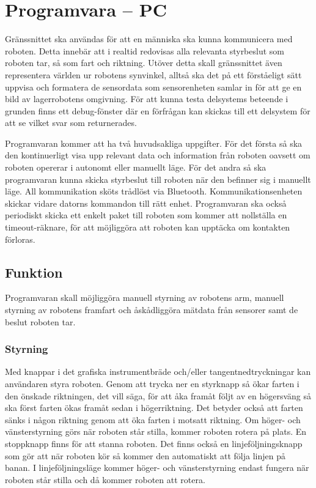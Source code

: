 

\section{Programvara – PC}

Gränssnittet ska användas för att en människa ska kunna kommunicera med roboten. Detta innebär att i realtid redovisas alla relevanta styrbeslut som roboten tar, så som fart och riktning. Utöver detta skall gränssnittet även representera världen ur robotens synvinkel, alltså ska det på ett förståeligt sätt uppvisa och formatera de sensordata som sensorenheten samlar in för att ge en bild av lagerrobotens omgivning. För att kunna testa delsystems beteende i grunden finns ett debug-fönster där en förfrågan kan skickas till ett delsystem för att se vilket svar som returnerades.




Programvaran kommer att ha två huvudsakliga uppgifter. För det första så ska den kontinuerligt visa upp relevant data och information från roboten oavsett om roboten opererar i autonomt eller manuellt läge. För det andra så ska programvaran kunna skicka styrbeslut till roboten när den befinner sig i manuellt läge. All kommunikation sköts trådlöst via Bluetooth. Kommunikationsenheten skickar vidare datorns kommandon till rätt enhet. Programvaran ska också periodiskt skicka ett enkelt paket till roboten som kommer att nollställa en timeout-räknare, för att möjliggöra att roboten kan upptäcka om kontakten förloras.

\subsection{Funktion}
Programvaran skall möjliggöra manuell styrning av robotens arm, manuell styrning av robotens framfart och åskådliggöra mätdata från sensorer samt de beslut roboten tar.

\subsubsection{Styrning}
Med knappar i det grafiska instrumentbräde och/eller tangentnedtryckningar kan användaren styra roboten. Genom att trycka ner en styrknapp så ökar farten i den önskade riktningen, det vill säga, för att åka framåt följt av en högersväng så ska först farten ökas framåt sedan i högerriktning. Det betyder också att farten sänks i någon riktning genom att öka farten i motsatt riktning. Om höger- och vänsterstyrning görs när roboten står stilla, kommer roboten rotera på plats. En stoppknapp finns för att stanna roboten. Det finns också en linjeföljningsknapp som gör att när roboten kör så kommer den automatiskt att följa linjen på banan. I linjeföljningsläge kommer höger- och vänsterstyrning endast fungera när roboten står stilla och då kommer roboten att rotera.


